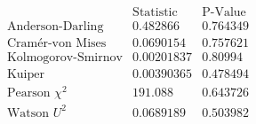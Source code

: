 \[\begin{array}{l|ll}
 \text{} & \text{Statistic} & \text{P-Value} \\
\hline
 \text{Anderson-Darling} & 0.482866 & 0.764349 \\
 \text{Cram{\' e}r-von Mises} & 0.0690154 & 0.757621 \\
 \text{Kolmogorov-Smirnov} & 0.00201837 & 0.80994 \\
 \text{Kuiper} & 0.00390365 & 0.478494 \\
 \text{Pearson }\chi ^2 & 191.088 & 0.643726 \\
 \text{Watson }U^2 & 0.0689189 & 0.503982 \\
\end{array}\]

